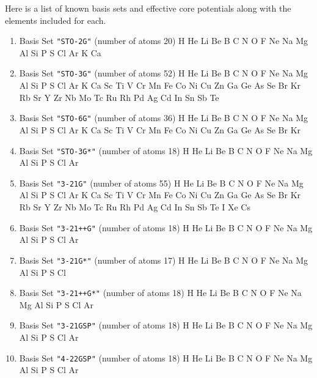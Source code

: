 \sloppy
Here is a list of known basis sets and effective core potentials along
with the elements included for each.
\begin{enumerate}

\item Basis Set \verb#"STO-2G"# (number of atoms 20)  \newline 
  H He Li Be B C N O F Ne Na Mg Al Si P S Cl Ar K Ca


\item Basis Set \verb#"STO-3G"# (number of atoms 52)  \newline 
  H He Li Be B C N O F Ne Na Mg Al Si P S Cl Ar K Ca Sc Ti V Cr Mn
 Fe Co Ni Cu Zn Ga Ge As Se Br Kr Rb Sr Y Zr Nb Mo Tc Ru Rh Pd Ag Cd In Sn
 Sb Te


\item Basis Set \verb#"STO-6G"# (number of atoms 36)  \newline 
  H He Li Be B C N O F Ne Na Mg Al Si P S Cl Ar K Ca Sc Ti V Cr Mn
 Fe Co Ni Cu Zn Ga Ge As Se Br Kr


\item Basis Set \verb#"STO-3G*"# (number of atoms 18)  \newline 
  H He Li Be B C N O F Ne Na Mg Al Si P S Cl Ar


\item Basis Set \verb#"3-21G"# (number of atoms 55)  \newline 
  H He Li Be B C N O F Ne Na Mg Al Si P S Cl Ar K Ca Sc Ti V Cr Mn
 Fe Co Ni Cu Zn Ga Ge As Se Br Kr Rb Sr Y Zr Nb Mo Tc Ru Rh Pd Ag Cd In Sn
 Sb Te I Xe Cs


\item Basis Set \verb#"3-21++G"# (number of atoms 18)  \newline 
  H He Li Be B C N O F Ne Na Mg Al Si P S Cl Ar


\item Basis Set \verb#"3-21G*"# (number of atoms 17)  \newline 
  H He Li Be B C N O F Ne Na Mg Al Si P S Cl


\item Basis Set \verb#"3-21++G*"# (number of atoms 18)  \newline 
  H He Li Be B C N O F Ne Na Mg Al Si P S Cl Ar


\item Basis Set \verb#"3-21GSP"# (number of atoms 18)  \newline 
  H He Li Be B C N O F Ne Na Mg Al Si P S Cl Ar


\item Basis Set \verb#"4-22GSP"# (number of atoms 18)  \newline 
  H He Li Be B C N O F Ne Na Mg Al Si P S Cl Ar



\end{enumerate}
